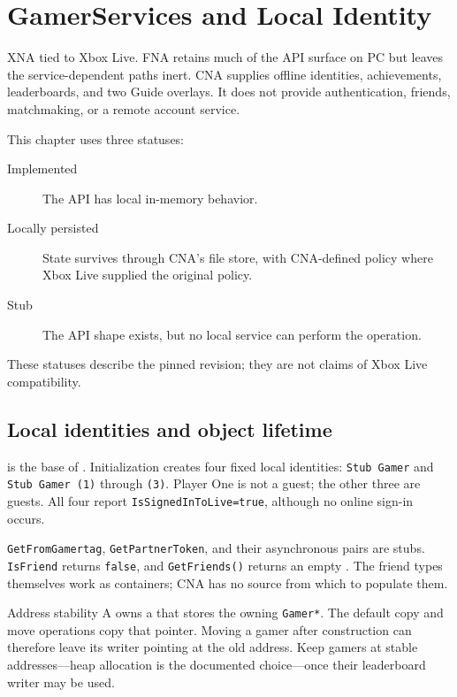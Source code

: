\chapter{GamerServices and Local Identity}
\label{ch:gamerservices}

XNA tied  to Xbox Live. FNA retains much of the API surface on PC but
leaves the service-dependent paths inert. CNA supplies offline identities, achievements,
leaderboards, and two Guide overlays. It does not provide authentication, friends, matchmaking,
or a remote account service.

This chapter uses three statuses:

\begin{description}
  \item[Implemented] The API has local in-memory behavior.
  \item[Locally persisted] State survives through CNA's file store, with CNA-defined policy where
        Xbox Live supplied the original policy.
  \item[Stub] The API shape exists, but no local service can perform the operation.
\end{description}

These statuses describe the pinned revision; they are not claims of Xbox Live compatibility.

\section{Local identities and object lifetime}

 is the base of . Initialization creates four fixed
local identities: \texttt{Stub Gamer} and \texttt{Stub Gamer (1)} through \texttt{(3)}. Player
One is not a guest; the other three are guests. All four report
\texttt{IsSignedInToLive=true}, although no online sign-in occurs.

\texttt{GetFromGamertag}, \texttt{GetPartnerToken}, and their asynchronous pairs are stubs.
\texttt{IsFriend} returns \texttt{false}, and \texttt{GetFriends()} returns an empty
. The friend types themselves work as containers; CNA has no source
from which to populate them.

\begin{limitationnote}{Address stability}
A  owns a  that stores the owning
\texttt{Gamer*}. The default copy and move operations copy that pointer. Moving a gamer after
construction can therefore leave its writer pointing at the old address. Keep gamers at stable
addresses---heap allocation is the documented choice---once their leaderboard writer may be
used.
\end{limitationnote}

